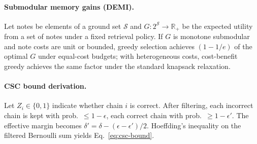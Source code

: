 \documentclass[11pt]{article}
\newcommand{\1}{\mathbb{I}}
\newcommand{\R}{\mathbb{R}}
\begin{document}
\paragraph{Submodular memory gains (DEMI).}
Let notes be elements of a ground set $\mathcal{S}$ and $G:2^{\mathcal{S}}\to\R_+$ be the expected utility from a set of notes under a fixed retrieval policy. If $G$ is monotone submodular and note costs are unit or bounded, greedy selection achieves $(1-1/e)$ of the optimal $G$ under equal-cost budgets; with heterogeneous costs, cost-benefit greedy achieves the same factor under the standard knapsack relaxation.

\paragraph{CSC bound derivation.}
Let $Z_i \in \{0,1\}$ indicate whether chain $i$ is correct. After filtering, each incorrect chain is kept with prob.\ $\le 1-\epsilon$, each correct chain with prob.\ $\ge 1-\epsilon'$. The effective margin becomes $\delta'=\delta - (\epsilon-\epsilon')/2$. Hoeffding's inequality on the filtered Bernoulli sum yields Eq.~\eqref{eq:csc-bound}.
\end{document}
